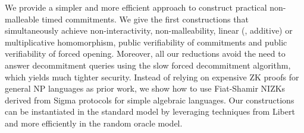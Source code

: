 We provide a simpler and more efficient approach to construct practical non-malleable timed commitments. We give the first constructions that simultaneously achieve non-interactivity, non-malleability, linear (\ie, additive) or multiplicative homomorphism, public verifiability of commitments and public verifiability of forced opening. Moreover, all our reductions avoid the need to answer decommitment queries using the slow forced decommitment algorithm, which yields much tighter security.
Instead of relying on expensive ZK proofs for general NP languages as prior work, we show how to use Fiat-Shamir \cite{C:FiaSha86} NIZKs derived from Sigma protocols for simple algebraic languages. Our constructions can be instantiated in the standard model by leveraging techniques from Libert \etal \cite{Libert2021OneShotFN} and more efficiently in the random oracle model.

